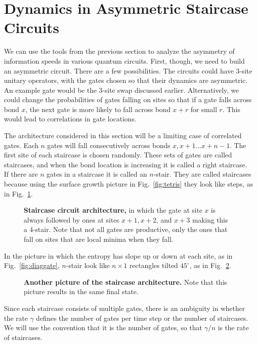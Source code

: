 \section{Dynamics in Asymmetric Staircase Circuits} \label{sec:stairs}

We can use the tools from the previous section to analyze the asymmetry of information speeds in various quantum circuits. First, though, we need to build an asymmetric circuit. There are a few possibilities. The circuits could have 3-site unitary operators, with the gates chosen so that their dynamics are asymmetric. An example gate would be the 3-site swap discussed earlier. Alternatively, we could change the probabilities of gates falling on sites so that if a gate falls across bond $x$, the next gate is more likely to fall across bond $x+r$ for small $r$. This would lead to correlations in gate locations.

The architecture considered in this section will be a limiting case of correlated gates. Each $n$ gates will fall consecutively across bonds $x, x+1\dots x+n-1$. The first site of each staircase is chosen randomly. These sets of gates are called staircases, and when the bond location is increasing it is called a right staircase. If there are $n$ gates in a staircase it is called an $n$-stair. They are called staircases because using the surface growth picture in Fig.~\ref{fig:tetris} they look like steps, as in Fig.~\ref{fig:stairs}. 
\begin{figure}
	\centering
	
	\caption{\textbf{Staircase circuit architecture,} in which the gate at site $x$ is always followed by ones at sites $x+1, x+2$, and $x+3$ making this a 4-stair. Note that not all gates are productive, only the ones that fall on sites that are local minima when they fall.}
	\label{fig:stairs}
\end{figure}
In the picture in which the entropy has slope up or down at each site, as in Fig.~\ref{fig:diaggate}, $n$-stair look like $n\times 1$ rectangles tilted $45^\circ$, as in Fig.~\ref{fig:diagstairs}.
\begin{figure}
	\centering
	
	\caption{\textbf{Another picture of the staircase architecture.} Note that this picture results in the same final state.}
	\label{fig:diagstairs}
\end{figure}
Since each staircase consists of multiple gates, there is an ambiguity in whether the rate $\gamma$ defines the number of gates per time step or the number of staircases. We will use the convention that it is the number of gates, so that $\gamma/n$ is the rate of staircases.

